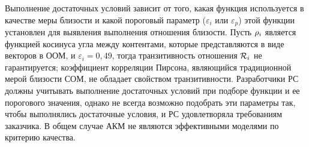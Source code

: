 Выполнение достаточных условий зависит от того, какая
функция используется в качестве меры близости и какой пороговый
параметр ($\varepsilon_{i}$ или $\varepsilon_p$) этой функции
установлен для выявления выполнения отношения близости.
Пусть $\mathcal{\rho}_i$ является функцией косинуса угла между контентами, которые
представляются в виде векторов в ООМ, и $\varepsilon_i = 0,49$, тогда
транзитивность отношения $\mathcal{R}_i$ не гарантируется; коэффициент корреляции Пирсона,
являющийся традиционной мерой близости СОМ, не обладает свойством
транзитивности. Разработчики РС должны учитывать выполнение достаточных условий
при подборе функции и ее порогового значения, однако не всегда возможно
подобрать эти параметры так, чтобы выполнялись достаточные условия, и РС
удовлетворяла требованиям заказчика. В общем случае АКМ не являются
эффективными моделями по критерию качества.

